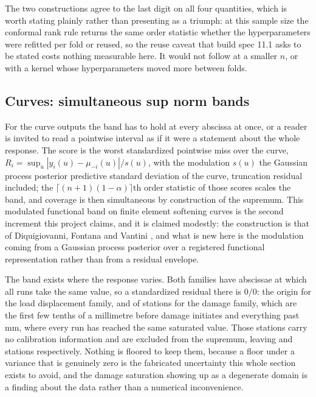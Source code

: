 \documentclass[11pt,a4paper]{article}
\begin{document}
\begin{table}[tbp]
\centering
\caption{Jackknife+ intervals on the four headline quantities of interest, over \NValid{} runs.
Coverage is measured by the nested leave one out described above, with its
\CalibrationWilsonLevel{}\,\% Wilson interval; the CV+ column is the honest cross check,
\ValidationFolds{} folds with the kernel hyperparameters, the constant mean and the noise all
refitted inside every fold, scored by the conformal rank rule on out of fold residuals.}
\label{tab:conformalscalars}
\footnotesize

\end{table}

The two constructions agree to the last digit on all four quantities, which is worth stating
plainly rather than presenting as a triumph: at this sample size the conformal rank rule returns
the same order statistic whether the hyperparameters were refitted per fold or reused, so the
reuse caveat that build spec 11.1 asks to be stated costs nothing measurable here. It would not
follow at a smaller $n$, or with a kernel whose hyperparameters moved more between folds.

\subsection{Curves: simultaneous sup norm bands}
\label{sec:functionalbands}
For the curve outputs the band has to hold at every abscissa at once, or a reader is invited to
read a pointwise interval as if it were a statement about the whole response. The score is the
worst standardized pointwise miss over the curve,
$R_i = \sup_u |y_i(u) - \mu_{-i}(u)| / s(u)$, with the modulation $s(u)$ the Gaussian process
posterior predictive standard deviation of the curve, truncation residual included; the
$\lceil (n+1)(1-\alpha) \rceil$th order statistic of those scores scales the band, and coverage
is then simultaneous by construction of the supremum. This modulated functional band on finite
element softening curves is the second increment this project claims, and it is claimed
modestly: the construction is that of Diquigiovanni, Fontana and Vantini
\cite{diquigiovanni2021,diquigiovanni2022}, and what is new here
is the modulation coming from a Gaussian process posterior over a registered functional
representation rather than from a residual envelope.

The band exists where the response varies. Both families have abscissae at which all \NValid{}
runs take the same value, so a standardized residual there is $0/0$: the origin for the load
displacement family, and \BandDamageExcluded{} of \GridPoints{} stations for the damage family,
which are the first few tenths of a millimetre before damage initiates and everything past
\BandDamageEnd\,mm, where every run has reached the same saturated value. Those stations carry
no calibration information and are excluded from the supremum, leaving \BandForceStations{} and
\BandDamageStations{} stations respectively. Nothing is floored to keep them, because a floor
under a variance that is genuinely zero is the fabricated uncertainty this whole section exists
to avoid, and the damage saturation showing up as a degenerate domain is a finding about the
data rather than a numerical inconvenience.
\end{document}
